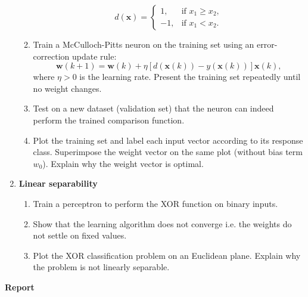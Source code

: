 \documentclass[12pt, a4]{article}
\begin{document}
\begin{enumerate}
\begin{enumerate}
                \begin{equation*}
                    d(\mathbf{x})=
                    \begin{cases}
                        1, & \text{if } x_1\geq x_2, \\
                        -1, & \text{if } x_1<x_2.
                    \end{cases}
                \end{equation*}
            \item Train a McCulloch-Pitts neuron on the training set
                using an error-correction update rule:
                \begin{equation}
                    \textbf{w}(k+1)=\mathbf{w}(k)+\eta
                    [d(\mathbf{x}(k))-y(\mathbf{x}(k))]\mathbf{x}(k),
                    \label{eq:errorupdate}
                \end{equation}
                where $\eta>0$ is the learning rate.
                Present the training set repeatedly until no weight
                changes.
            \item Test on a new dataset (validation set) that the
                neuron can indeed perform the trained comparison function.
            \item\label{it:optimalweight} Plot the training set and label each
                input vector according to its response class. Superimpose the
                weight vector on the same plot (without bias term $w_0$).
                Explain why the weight vector is optimal.
        \end{enumerate}
    \item \textbf{Linear separability}
        \begin{enumerate}
            \item Train a perceptron to perform the XOR function on binary
                inputs.
            \item \label{it:xor_err} Show that the learning algorithm does not converge
                i.e. the weights do not settle on fixed values.
            \item \label{it:xor_plot} Plot the XOR classification problem on an
                Euclidean plane. Explain why the problem is not
                linearly separable. 
        \end{enumerate}

\end{enumerate}

{\bf Report}
\end{document}
